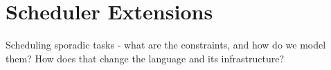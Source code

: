 \section{Scheduler Extensions}


Scheduling sporadic tasks - what are the constraints, and how do we model them?  How does that change the language and its infrastructure?